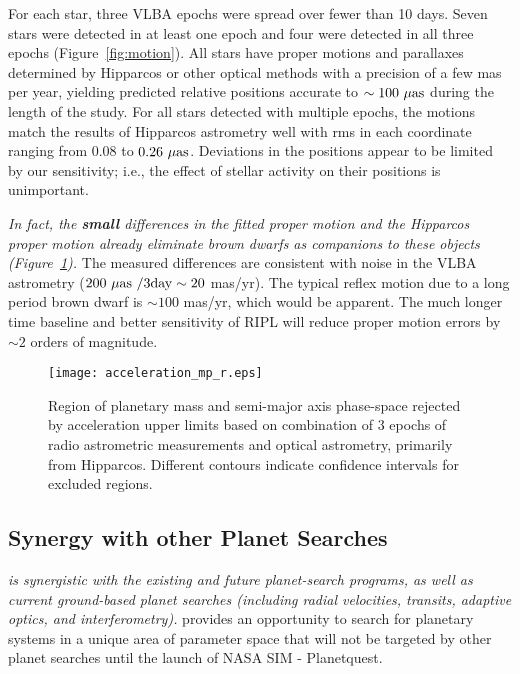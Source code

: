 \documentclass[12pt,preprint]{aastex}
\begin{document}
For each star, three VLBA epochs were spread over fewer than 10 days.
Seven stars were detected in at least one epoch and four were detected
in all three epochs (Figure~\ref{fig:motion}).
All stars have proper motions and parallaxes determined by Hipparcos
or other optical methods with a precision of a few mas per year,
yielding predicted relative positions accurate to $\sim 100 {\rm\ \mu as}$ during
the length of the study.  For all stars detected with multiple epochs,
the motions match the results of Hipparcos astrometry well with rms in
each coordinate ranging from 0.08 to $0.26 {\rm\ \mu as}$.
Deviations in the positions appear to be limited by our
sensitivity; i.e., the effect of stellar
activity on their positions is unimportant.

{\em In fact, the {\bf small} differences in the fitted proper motion
and the Hipparcos proper motion already eliminate brown dwarfs as
companions to these objects (Figure~\ref{fig:accel}).}  The measured
differences are consistent with noise in the VLBA astrometry ($200 {\rm\ \mu as}
{\rm\ / 3 day} \sim 20$ mas/yr).  The typical reflex motion due to
a long period brown dwarf is $\sim 100$ mas/yr, which would be
apparent.  The much longer time baseline and better sensitivity of
RIPL will reduce proper motion errors by $\sim 2$ orders of magnitude.

\begin{figure}[tb]
\texttt{[image: acceleration\_mp\_r.eps]}
\caption[]{Region of planetary mass and semi-major axis phase-space rejected by 
acceleration upper limits based on combination of 3 epochs of radio astrometric 
measurements and optical astrometry, primarily from Hipparcos.  Different 
contours indicate confidence intervals for excluded regions.
\label{fig:accel}}
\end{figure}

\subsection{Synergy with other Planet Searches}

{\em \ripl is synergistic with the existing and future planet-search 
programs, as well as current ground-based planet searches (including 
radial velocities, transits, adaptive optics, and interferometry).} 
\ripl provides an opportunity to search for planetary systems in a 
unique area of parameter space that will not be targeted by other planet 
searches until the launch of NASA SIM - Planetquest.  
\end{document}
